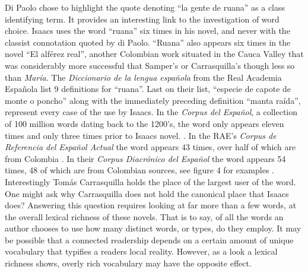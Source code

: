 Di Paolo chose to highlight the quote denoting \enquote{la gente de ruana} as a class identifying term. It provides an interesting link to the investigation of word choice.
Isaacs uses the word \enquote{ruana} six times in his novel, and never with the classist connotation quoted by di Paolo.
\enquote{Ruana} also appears six times in the novel \enquote{El alférez real}, another Colombian work situated in the Cauca Valley that was considerably more successful that Samper's or Carrasquilla's though less so than \textit{María}.
The \textit{Diccionario de la lengua española} from the Real Academia Española list 9 definitions for \enquote{ruana}.
Last on their list, \enquote{especie de capote de monte o poncho} along with the immediately preceding definition \enquote{manta raída}, represent every case of the use by Isaacs.
In the \textit{Corpus del Español}, a collection of 100 million words dating back to the 1200's, the word only appears eleven times and only three times prior to Isaacs novel. \autocite{Davies2012}. 
In the RAE's \textit{Corpus de Referencia del Español Actual} the word appears 43 times, over half of which are from Colombia \autocite{Crea}.
In their \textit{Corpus Diacrónico del Español} the word appears 54 times, 48 of which are from Colombian sources, see figure 4 for examples \autocite{Corde}.
Interestingly Tomás Carrasquilla holds the place of the largest user of the word.
One might ask why Carrasquilla does not hold the canonical place that Isaacs does?
Answering this question requires looking at far more than a few words, at the overall lexical richness of these novels.
That is to say, of all the words an author chooses to use how many distinct words, or types, do they employ.
It may be possible that a connected readership depends on a certain amount of unique vocabulary that typifies a readers local reality.
However, as a look a lexical richness shows, overly rich vocabulary may have the opposite effect. 

